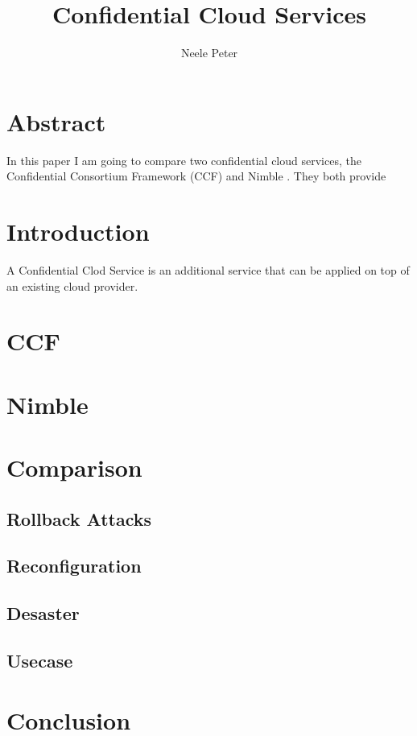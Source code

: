 \documentclass[acmtog]{acmart}
\title{Confidential Cloud Services}
\author{Neele Peter}
\begin{document}
	
	
\maketitle

\section{Abstract}	
	In this paper I am going to compare two confidential cloud services, the Confidential Consortium Framework (CCF) \cite{Howard} and Nimble \cite{Nimble}. They both provide \\


\section{Introduction}
	A Confidential Clod Service is an additional service that can be applied on top of an existing cloud provider. 
	
\newpage

\section{CCF}	
\newpage

\section{Nimble}
\newpage

\section{Comparison}
\subsection{Rollback Attacks}
\subsection{Reconfiguration}
\subsection{Desaster}
\subsection{Usecase}
\newpage

\section{Conclusion}

\newpage


	
\end{document}
